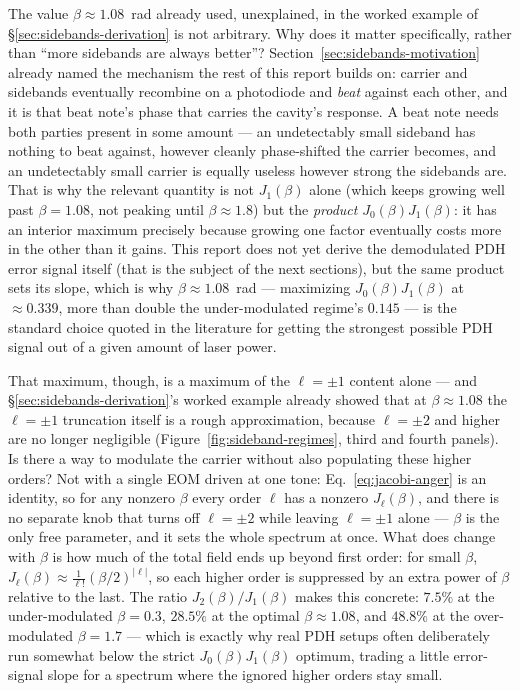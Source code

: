 \documentclass[9pt]{article}
\begin{document}
The value $\beta\approx1.08$~rad already used, unexplained, in the worked
example of \S\ref{sec:sidebands-derivation} is not arbitrary. Why does it
matter specifically, rather than ``more sidebands are always better''?
Section~\ref{sec:sidebands-motivation} already named the mechanism the rest
of this report builds on: carrier and
sidebands eventually recombine on a photodiode and \emph{beat} against each
other, and it is that beat note's phase that carries the cavity's response.
A beat note needs both parties present in some amount --- an
undetectably small sideband has nothing to beat against, however cleanly
phase-shifted the carrier becomes, and an undetectably small carrier is
equally useless however strong the sidebands are. That is why the relevant
quantity is not $J_1(\beta)$ alone (which keeps growing well past
$\beta=1.08$, not peaking until $\beta\approx1.8$) but the \emph{product}
$J_0(\beta)J_1(\beta)$: it has an interior maximum precisely because growing
one factor eventually costs more in the other than it gains. This report
does not yet derive the demodulated PDH error signal itself (that is the
subject of the next sections), but the same product sets its slope, which
is why $\beta\approx1.08$~rad --- maximizing $J_0(\beta)J_1(\beta)$ at
$\approx0.339$, more than double the under-modulated regime's $0.145$ --- is
the standard choice quoted in the literature \cite{black2001pdh} for getting the
strongest possible PDH signal out of a given amount of laser power.

That maximum, though, is a maximum of the $\ell=\pm1$ content alone --- and
\S\ref{sec:sidebands-derivation}'s worked example already showed that at
$\beta\approx1.08$ the $\ell=\pm1$ truncation itself is a rough
approximation, because $\ell=\pm2$ and higher are no longer negligible
(Figure~\ref{fig:sideband-regimes}, third and fourth panels). Is there a way
to modulate the carrier without also populating these higher orders? Not
with a single EOM driven at one tone: Eq.~\eqref{eq:jacobi-anger} is an
identity, so for any nonzero $\beta$ every order $\ell$ has a nonzero
$J_\ell(\beta)$, and there is no separate knob that turns off $\ell=\pm2$
while leaving $\ell=\pm1$ alone --- $\beta$ is the only free parameter, and
it sets the whole spectrum at once. What does change with $\beta$ is how
much of the total field ends up beyond first order: for small $\beta$,
$J_\ell(\beta)\approx\frac{1}{\ell!}(\beta/2)^{|\ell|}$, so each higher order
is suppressed by an extra power of $\beta$ relative to the last. The ratio
$J_2(\beta)/J_1(\beta)$ makes this concrete: $7.5\%$ at the under-modulated
$\beta=0.3$, $28.5\%$ at the optimal $\beta\approx1.08$, and $48.8\%$ at the
over-modulated $\beta=1.7$ --- which is exactly why real PDH setups often
deliberately run somewhat below the strict $J_0(\beta)J_1(\beta)$ optimum,
trading a little error-signal slope for a spectrum where the ignored higher
orders stay small.
\end{document}
